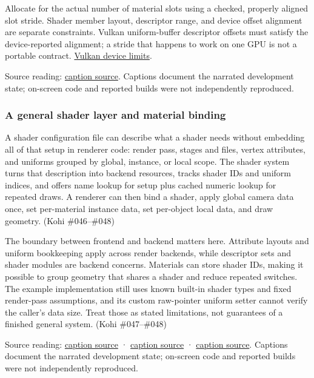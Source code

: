Allocate for the actual number of material slots using a checked, properly aligned slot stride. Shader member layout, descriptor range, and device offset alignment are separate constraints. Vulkan uniform-buffer descriptor offsets must satisfy the device-reported alignment; a stride that happens to work on one GPU is not a portable contract. \href{https://docs.vulkan.org/refpages/latest/refpages/source/VkPhysicalDeviceLimits.html}{Vulkan device limits}.

Source reading: \href{https://www.youtube.com/watch?v=K_jD7--h7F8}{caption source}. Captions document the narrated development state; on-screen code and reported builds were not independently reproduced.

\subsubsection{A general shader layer and material binding}\label{06-engine-ii-ch025-a-general-shader-layer-and-material-binding}

\hypertarget{06-engine-ii-ch025-a-general-shader-layer-and-material-binding}{}

A shader configuration file can describe what a shader needs without embedding all of that setup in renderer code: render pass, stages and files, vertex attributes, and uniforms grouped by global, instance, or local scope. The shader system turns that description into backend resources, tracks shader IDs and uniform indices, and offers name lookup for setup plus cached numeric lookup for repeated draws. A renderer can then bind a shader, apply global camera data once, set per-material instance data, set per-object local data, and draw geometry. (Kohi \#046--\#048)

The boundary between frontend and backend matters here. Attribute layouts and uniform bookkeeping apply across render backends, while descriptor sets and shader modules are backend concerns. Materials can store shader IDs, making it possible to group geometry that shares a shader and reduce repeated switches. The example implementation still uses known built-in shader types and fixed render-pass assumptions, and its custom raw-pointer uniform setter cannot verify the caller's data size. Treat those as stated limitations, not guarantees of a finished general system. (Kohi \#047--\#048)

Source reading: \href{https://www.youtube.com/watch?v=T8-Tv4UsKCk}{caption source} · \href{https://www.youtube.com/watch?v=4E0v_5Wva-8}{caption source} · \href{https://www.youtube.com/watch?v=9nP3aBsrCXs}{caption source}. Captions document the narrated development state; on-screen code and reported builds were not independently reproduced.

